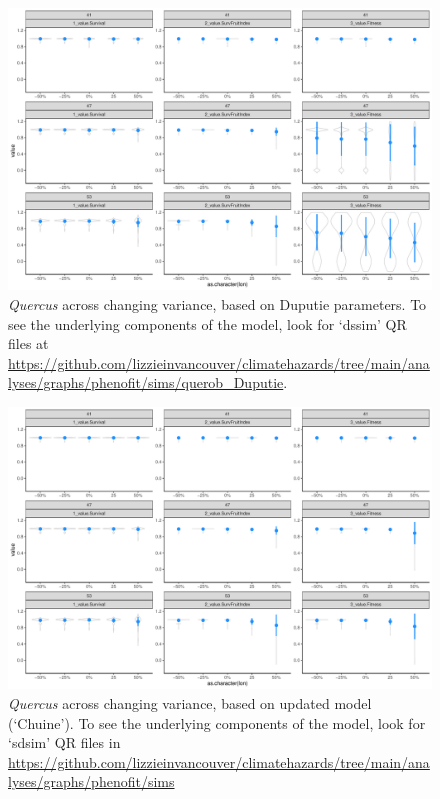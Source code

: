 \documentclass[11pt,letter]{article}
\begin{document}
\begin{figure}[h!]
 \begin{center}
\noindent \includegraphics[width=1\textwidth]{..//analyses/graphs/phenofit/sims/querob_Duputie/sdsim_3metricsQR.pdf}
  \caption{\emph{Quercus} across changing variance, based on Duputie parameters. To see the underlying components of the model, look for `dssim' QR files at \url{https://github.com/lizzieinvancouver/climatehazards/tree/main/analyses/graphs/phenofit/sims/querob_Duputie}.}
  \label{fig:simssdDup}
  \end{center}
\end{figure}

\begin{figure}[h!]
 \begin{center}
\noindent \includegraphics[width=1\textwidth]{..//analyses/graphs/phenofit/sims/metrics3/sdsim_3metricsQR.pdf}
  \caption{\emph{Quercus} across changing variance, based on updated model (`Chuine'). To see the underlying components of the model, look for `sdsim' QR files in \url{https://github.com/lizzieinvancouver/climatehazards/tree/main/analyses/graphs/phenofit/sims}}
  \label{fig:simssdUp}
  \end{center}
\end{figure}
\end{document}
